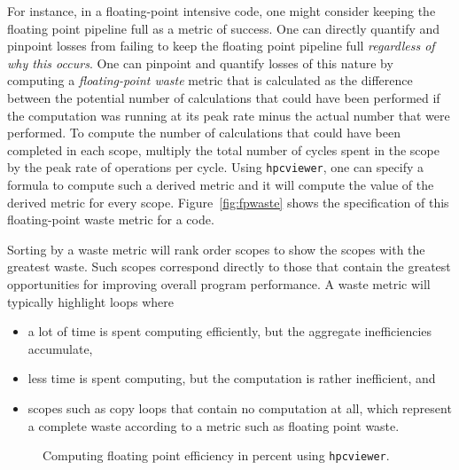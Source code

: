 \documentclass[12pt]{article}
\begin{document}
For instance, in a floating-point intensive code, one might consider keeping the floating point pipeline full as a metric of success. One can directly quantify and pinpoint losses from failing to keep the floating point pipeline full {\em regardless of why this occurs}. One can pinpoint and quantify losses of this nature by computing a {\em floating-point waste} metric that is calculated as the difference between the potential number of calculations that could have been performed if the computation was running at its peak rate minus the actual number that were performed.  To compute the number of calculations that could have been completed in each scope, multiply  the total number of cycles spent in the scope by the peak rate of operations per cycle. 
Using {\tt hpcviewer}, one can specify a formula to compute such a derived metric and it will compute the value of the derived metric for every scope. Figure~\ref{fig:fpwaste} shows the specification of this floating-point waste metric for a code.

Sorting by a waste metric will rank order scopes 
to show the scopes with the greatest waste. Such scopes correspond directly to those that contain the greatest opportunities for improving overall program performance. 
A waste metric will typically highlight loops where 
\begin{itemize}
\item a lot of time is spent computing efficiently, but the aggregate inefficiencies accumulate,
\item less time is spent computing, but the computation is rather inefficient, and
\item scopes such as copy loops that contain no computation at all, which represent a complete waste according to a metric such as floating point waste.
\end{itemize}

\begin{figure}[t]
\caption{Computing floating point efficiency in percent using {\tt hpcviewer}.}
\label{fig:fpefficiency}
\end{figure}
\end{document}
